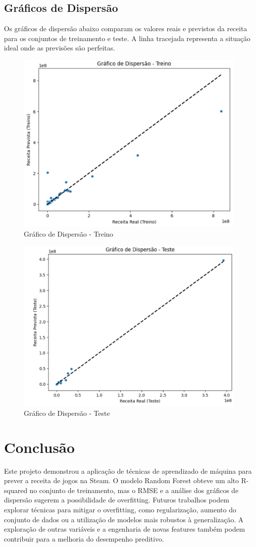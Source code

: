 \documentclass[12pt]{article}
\begin{document}
\subsection{Gráficos de Dispersão}

Os gráficos de dispersão abaixo comparam os valores reais e previstos da receita para os conjuntos de treinamento e teste.  A linha tracejada representa a situação ideal onde as previsões são perfeitas.


\begin{figure}
    \centering
    \includegraphics[width=0.5\linewidth]{graficoDispersaoTreino}
    \caption{Gráfico de Dispersão - Treino}
    \label{fig:enter-label}
\end{figure}

\begin{figure}
    \centering
    \includegraphics[width=0.5\linewidth]{graficoDispersaoTeste.png}
    \caption{Gráfico de Dispersão - Teste}
    \label{fig:enter-label}
\end{figure}


\section{Conclusão}

Este projeto demonstrou a aplicação de técnicas de aprendizado de máquina para prever a receita de jogos na Steam.  O modelo Random Forest obteve um alto R-squared no conjunto de treinamento, mas o RMSE e a análise dos gráficos de dispersão sugerem a possibilidade de overfitting.  Futuros trabalhos podem explorar técnicas para mitigar o overfitting, como regularização, aumento do conjunto de dados ou a utilização de modelos mais robustos à generalização.  A exploração de outras variáveis e a engenharia de novas features também podem contribuir para a melhoria do desempenho preditivo.
\end{document}
